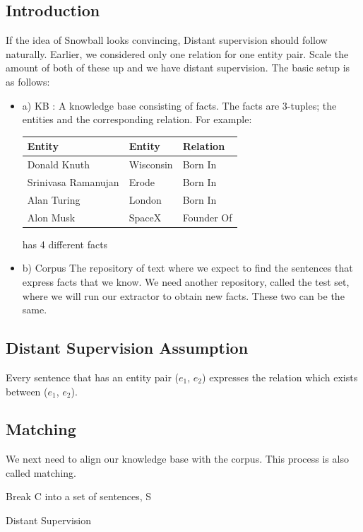 \documentclass[a4paper,10pt]{article}
\begin{document}
\subsection{Introduction}
If the idea of Snowball looks convincing, Distant supervision should follow naturally.
Earlier, we considered only one relation for one entity pair. Scale the amount of both of these up
and we have distant supervision.
The basic setup is as follows:
\begin{itemize}

\item a) KB : A knowledge base consisting of facts. The facts are 3-tuples; the entities and the corresponding relation.
For example:
\begin{center}
\begin{tabular}{|l|l|l|}
\hline
Entity & Entity & Relation \\
\hline
Donald Knuth & Wisconsin & Born In\\
Srinivasa Ramanujan & Erode & Born In \\
Alan Turing & London & Born In \\
Alon Musk & SpaceX & Founder Of\\
\hline
\end{tabular}
\end{center}
has 4 different facts

\item b) Corpus
The repository of text where we expect to find the sentences that express facts that we know.
We need another repository, called the test set, where we will run our extractor to obtain new facts.
These two can be the same.
\end{itemize}

\subsection{Distant Supervision Assumption}
Every sentence that has an entity pair ($e_1$, $e_2$) expresses the relation which exists between ($e_1$, $e_2$).
\subsection{Matching}
We next need to align our knowledge base with the corpus. This process is also called matching.
  
\begin{algorithm}
 Break C into a set of sentences, S\;
 \caption{Distant Supervision}
\end{algorithm}
\end{document}
